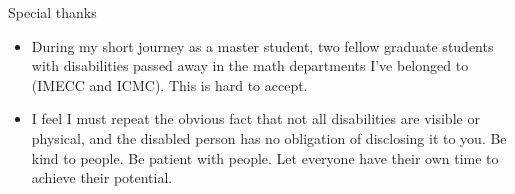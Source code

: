 \documentclass[shortlabels, 9pt, aspectratio=2013]{beamer}
\begin{document}
\begin{frame}{Special thanks}
  \begin{itemize}
  \item During my short journey as a master student, two fellow graduate students with disabilities passed away in the math departments I've belonged to (IMECC and ICMC). This is hard to accept.
  \item I feel I must repeat the obvious fact that not all disabilities are visible or physical, and the disabled person has no obligation of disclosing it to you. Be kind to people. Be patient with people. Let everyone have their own time to achieve their potential.
  \end{itemize}
\end{frame}
\end{document}
